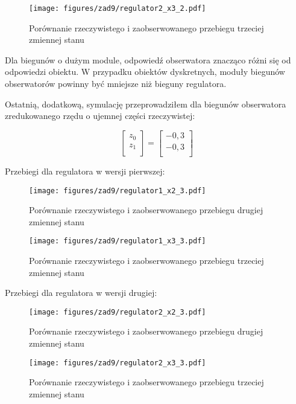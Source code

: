 \documentclass[a4paper,titlepage,11pt,floatssmall]{mwrep}
\begin{document}
\begin{figure}[H]
\centering
\texttt{[image: figures/zad9/regulator2\_x3\_2.pdf]}
\caption{Porównanie rzeczywistego i zaobserwowanego przebiegu trzeciej zmiennej stanu}
\end{figure} 

Dla biegunów o dużym module, odpowiedź obserwatora znacząco różni się od odpowiedzi obiektu. W przypadku obiektów dyskretnych, moduły biegunów obserwatorów powinny być mniejsze niż bieguny regulatora.
\newpage


\indent Ostatnią, dodatkową, symulację przeprowadziłem dla biegunów obserwatora zredukowanego rzędu o ujemnej części rzeczywistej:

\[
\begin{bmatrix}
    z_{0} \\
    z_{1} \\    
\end{bmatrix}
=
\begin{bmatrix}
    -0,3 \\
    -0,3 \\    
\end{bmatrix}
\]

Przebiegi dla regulatora w wersji pierwszej:
\begin{figure}[H]
\centering
\texttt{[image: figures/zad9/regulator1\_x2\_3.pdf]}
\caption{Porównanie rzeczywistego i zaobserwowanego przebiegu drugiej zmiennej stanu}
\end{figure} 

\begin{figure}[H]
\centering
\texttt{[image: figures/zad9/regulator1\_x3\_3.pdf]}
\caption{Porównanie rzeczywistego i zaobserwowanego przebiegu trzeciej zmiennej stanu}
\end{figure} 
\newpage


Przebiegi dla regulatora w wersji drugiej:
\begin{figure}[H]
\centering
\texttt{[image: figures/zad9/regulator2\_x2\_3.pdf]}
\caption{Porównanie rzeczywistego i zaobserwowanego przebiegu drugiej zmiennej stanu}
\end{figure} 

\begin{figure}[H]
\centering
\texttt{[image: figures/zad9/regulator2\_x3\_3.pdf]}
\caption{Porównanie rzeczywistego i zaobserwowanego przebiegu trzeciej zmiennej stanu}
\end{figure} 
\end{document}
